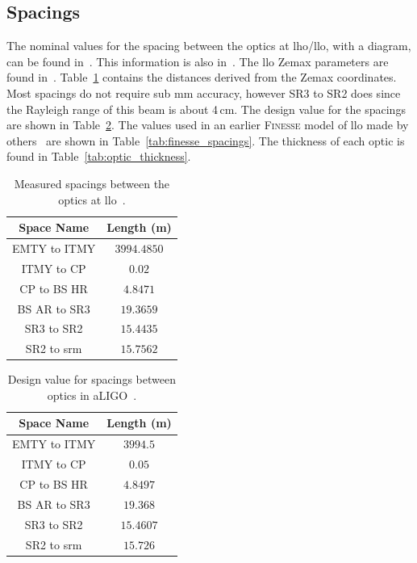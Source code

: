 \subsection{Spacings}
The nominal values for the spacing between the optics at \gls{lho}/\gls{llo}, with a diagram, can be found in~\cite{aligo_layout_h1}. This information is also in~\cite{Muzammil2016}. The \gls{llo} Zemax parameters are found in~\cite{Zeemax_L1}. Table~\ref{tab:zeemax_spacings} contains the distances derived from the Zemax coordinates. Most spacings do not require sub mm accuracy, however SR3 to SR2 does since the Rayleigh range of this beam is about 4\,cm. The design value for the spacings are shown in Table~\ref{tab:design_spacings}. The values used in an earlier \textsc{Finesse} model of \gls{llo} made by others~\cite{l1_finesse_2014} are shown in Table~\ref{tab:finesse_spacings}. The thickness of each optic is found in Table~\ref{tab:optic_thickness}.
\begin{table}[ht]
	\centering
	\begin{tabular}{ c | c }
		Space Name & Length (m) \\
		\hline
		EMTY to ITMY & $3994.4850$ \\
		ITMY to CP & $0.02$ \\
		CP to BS HR &  $4.8471$ \\
		BS AR to SR3 & $19.3659$ \\
		SR3 to SR2 & $15.4435$ \\
		SR2 to \gls{srm} & $15.7562$ \\
	\end{tabular}
\caption[Measured spacings between the optics at LLO.]{Measured spacings between the optics at \gls{llo}~\cite{Zeemax_L1}.}
\label{tab:zeemax_spacings}
\end{table}
\begin{table}[ht]
	\centering
	\begin{tabular}{ c | c }
		Space Name & Length (m) \\
		\hline
		EMTY to ITMY & $3994.5$ \\
		ITMY to CP & $0.05$ \\
		CP to BS HR & $4.8497$ \\
		BS AR to SR3 & $19.368$ \\
		SR3 to SR2 & $15.4607$ \\
		SR2 to \gls{srm} & $15.726$ \\
	\end{tabular}
	\caption[Design values for spacings between optics in aLIGO.]{Design value for spacings between optics in aLIGO~\cite{aligo_layout_h1}.}
	\label{tab:design_spacings}
\end{table}
